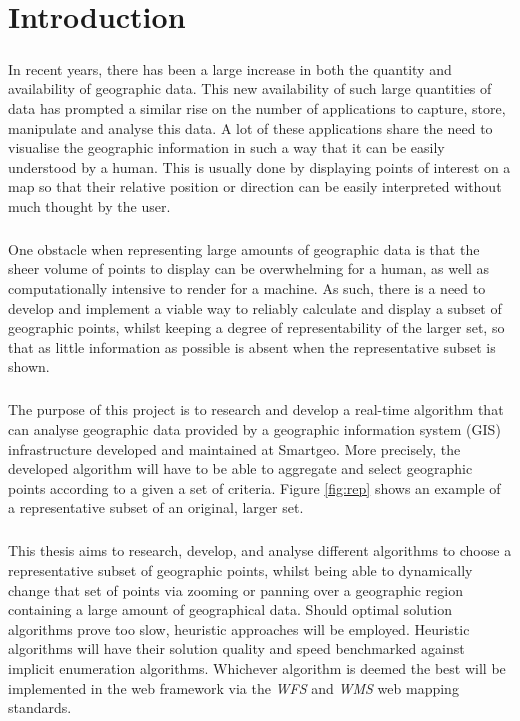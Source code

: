 \chapter{Introduction}
\label{chap:intro}
\paragraph{}
In recent years, there has been a large increase in both the quantity and availability of geographic data. This new availability of such large quantities of data has prompted a similar rise on the number of applications to capture, store, manipulate and analyse this data.
A lot of these applications share the need to visualise the geographic information in such a way that it can be easily understood by a human.
This is usually done by displaying points of interest on a map so that their relative position or direction can be easily interpreted without much thought by the user.
\paragraph{}
One obstacle when representing large amounts of geographic data is that the sheer volume of points to display can be overwhelming for a human, as well as computationally intensive to render for a machine. As such, there is a need to develop and implement a viable way to reliably calculate and display a subset of geographic points, whilst keeping a degree of representability of the larger set, so that as little information as possible is absent when the representative subset is shown.
\paragraph{}
The purpose of this project is to research and develop a real-time algorithm that can analyse geographic data provided by a geographic information system (GIS) infrastructure developed and maintained at Smartgeo. More precisely, the developed algorithm will have to be able to aggregate and select geographic points according to a given a set of criteria. Figure \ref{fig:rep} shows an example of a representative subset of an original, larger set.

\paragraph{}
This thesis aims to research, develop, and analyse different algorithms to choose a representative subset of geographic points, whilst being able to dynamically change that set of points via zooming or panning over a geographic region containing a large amount of geographical data. Should optimal solution algorithms prove too slow, heuristic approaches will be employed. Heuristic algorithms will have their solution quality and speed benchmarked against implicit enumeration algorithms.
Whichever algorithm is deemed the best will be implemented in the web framework via the \emph{WFS} and \emph{WMS} web mapping standards.
